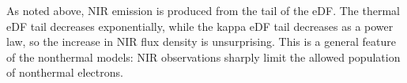 As noted above, NIR emission is produced from the tail of the eDF.  The thermal eDF tail decreases exponentially, while the kappa eDF tail decreases as a power law, so the increase in NIR flux density is unsurprising.  This is a general feature of the nonthermal models: NIR observations sharply limit the allowed population of nonthermal electrons.







